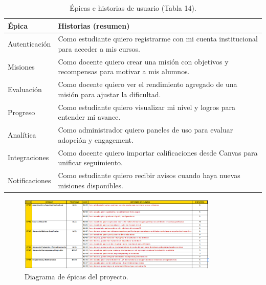 \begin{table}[ht]
	\centering
	\caption{Épicas e historias de usuario (Tabla 14).}
	\begin{tabular}{p{3cm} p{10cm}}
		\toprule
		Épica & Historias (resumen) \\
		\midrule
		Autenticación & Como estudiante quiero registrarme con mi cuenta institucional para acceder a mis cursos.\\
		Misiones & Como docente quiero crear una misión con objetivos y recompensas para motivar a mis alumnos.\\
		Evaluación & Como docente quiero ver el rendimiento agregado de una misión para ajustar la dificultad.\\
		Progreso & Como estudiante quiero visualizar mi nivel y logros para entender mi avance.\\
		Analítica & Como administrador quiero paneles de uso para evaluar adopción y engagement.\\
		Integraciones & Como docente quiero importar calificaciones desde Canvas para unificar seguimiento.\\
		Notificaciones & Como estudiante quiero recibir avisos cuando haya nuevas misiones disponibles.\\
		\bottomrule
	\end{tabular}
\end{table}

\begin{figure}[H]
	\centering
	\includegraphics[width=0.85\textwidth]{images/epicas.png}
	\caption{Diagrama de épicas del proyecto.}
	\label{fig:epicas}
\end{figure}

